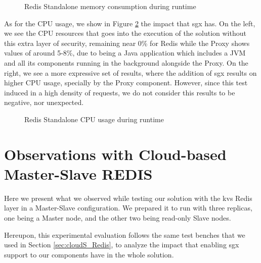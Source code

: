 \begin{figure}[htbp]
	\centering
	\caption{Redis Standalone memory consumption during runtime}
	\label{fig:MemoryConsumption_standalone}
\end{figure}

As for the CPU usage, we show in Figure \ref{fig:cpuUsageStandalone} the impact that \gls{sgx} has. On the left, we see the CPU resources that goes into the execution of the solution without this extra layer of security, remaining near 0\% for Redis while the Proxy shows values of around 5-8\%, due to being a Java application which includes a JVM and all its components running in the background alongside the Proxy. On the right, we see a more expressive set of results, where the addition of \gls{sgx} results on higher CPU usage, specially by the Proxy component. However, since this test induced in a high density of requests, we do not consider this results to be negative, nor unexpected.

\begin{figure}[htbp]
	\centering
	\caption{Redis Standalone CPU usage during runtime}
	\label{fig:cpuUsageStandalone}
\end{figure}

\section{Observations with Cloud-based Master-Slave REDIS}
\label{sec:cloud_MS_Redis}

Here we present what we observed while testing our solution with the \gls{kvs} Redis layer in a Master-Slave configuration. We prepared it to run with three replicas, one being a Master node, and the other two being read-only Slave nodes. 

Hereupon, this experimental evaluation follows the same test benches that we used in Section \ref{sec:cloudS_Redis}, to analyze the impact that enabling \gls{sgx} support to our components have in the whole solution.

